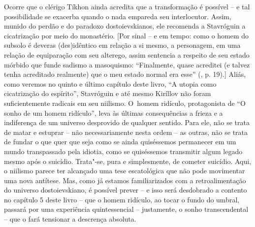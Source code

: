 {Ocorre que o clérigo Tíkhon ainda acredita que a transformação é
possível -- e tal possibilidade se exacerba quando o nada empareda seu
interlocutor. Assim, munido do perdão e do paradoxo dostoievskianos, ele
recomenda a Stavróguin a cicatrização por meio do monastério. {[}Por
sinal -- e em tempo: como o homem do subsolo é deveras (des)idêntico em
relação a si mesmo, a personagem, em uma relação de equiparação com seu
alterego, assim sentencia a respeito de seu estado mórbido que funde
sadismo a masoquismo: ``Finalmente, quase acreditei (e talvez tenha
acreditado realmente) que o meu estado normal era esse'' (, p.
19).{]} Aliás, como veremos no quinto e último capítulo deste livro, ``A
utopia como cicatrização do espírito'', Stavróguin e até mesmo Kiríllov
não foram suficientemente radicais em seu niilismo. O~homem ridículo,
protagonista de ``O sonho de um homem ridículo'', leva às últimas
consequências a frieza e a indiferença de um universo desprovido de
qualquer sentido. Para ele, não se trata de matar e estuprar -- não
necessariamente nesta ordem -- as outras, não se trata de fundar o que
quer que seja como se ainda quiséssemos permanecer em um mundo
transpassado pela idiotia, como se quiséssemos transmitir algum legado
mesmo após o suicídio. Trata"-se, pura e simplesmente, de cometer
suicídio. Aqui, o niilismo parece ter alcançado uma tese escatológica
que não pode movimentar uma nova antítese. Mas, como já estamos
familiarizados com a retroalimentação do universo dostoievskiano, é
possível prever -- e isso será desdobrado a contento no capítulo 5 deste
livro -- que o homem ridículo, ao tocar o fundo do umbral, passará por
uma experiência quintessencial -- justamente, o sonho transcendental --
que o fará tensionar a descrença absoluta.

}
